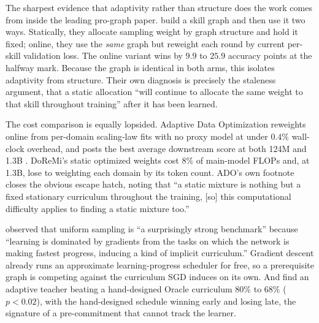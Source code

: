 \documentclass[11pt]{article}
\theoremstyle{plain}
\theoremstyle{definition}
\theoremstyle{remark}
\begin{document}
The sharpest evidence that adaptivity rather than structure does the work comes
from inside the leading pro-graph paper. \citet{chen2023skillit} build a skill
graph and then use it two ways. Statically, they allocate sampling weight by
graph structure and hold it fixed; online, they use the \emph{same} graph but
reweight each round by current per-skill validation loss. The online variant
wins by $9.9$ to $25.9$ accuracy points at the halfway mark. Because the graph is
identical in both arms, this isolates adaptivity from structure. Their own
diagnosis is precisely the staleness argument, that a static allocation ``will
continue to allocate the same weight to that skill throughout training'' after it
has been learned.

The cost comparison is equally lopsided. Adaptive Data Optimization reweights
online from per-domain scaling-law fits with no proxy model at under $0.4\%$
wall-clock overhead, and posts the best average downstream score at both 124M and
1.3B \citep{jiang2025ado}. DoReMi's static optimized weights cost $8\%$ of
main-model FLOPs \citep{xie2023doremi} and, at 1.3B, lose to weighting each domain
by its token count. ADO's own footnote closes the obvious escape hatch, noting
that ``a static mixture is nothing but a fixed stationary curriculum throughout
the training, [so] this computational difficulty applies to finding a static
mixture too.''

\citet{graves2017automated} observed that uniform sampling is ``a surprisingly
strong benchmark'' because
``learning is dominated by gradients from the tasks on which the network is
making fastest progress, inducing a kind of implicit curriculum.'' Gradient
descent already runs an approximate learning-progress scheduler for free, so a
prerequisite graph is competing against the curriculum SGD induces on its own. And \citet{portelas2019teacher} find an adaptive teacher beating a
hand-designed Oracle curriculum $80\%$ to $68\%$ ($p < 0.02$), with the
hand-designed schedule winning early and losing late, the signature of a
pre-commitment that cannot track the learner.
\end{document}
